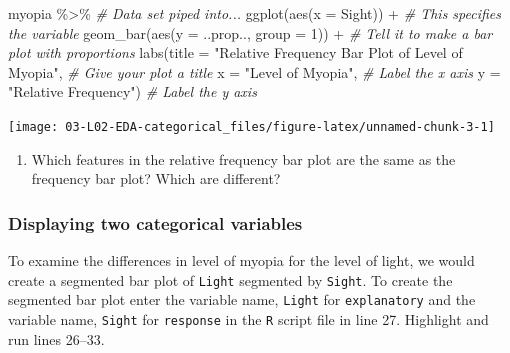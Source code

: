 \documentclass[
]{report}
\newenvironment{Shaded}{\begin{snugshade}}{\end{snugshade}}
\newcommand{\AttributeTok}[1]{\textcolor[rgb]{0.77,0.63,0.00}{#1}}
\newcommand{\CommentTok}[1]{\textcolor[rgb]{0.56,0.35,0.01}{\textit{#1}}}
\newcommand{\DecValTok}[1]{\textcolor[rgb]{0.00,0.00,0.81}{#1}}
\newcommand{\FunctionTok}[1]{\textcolor[rgb]{0.00,0.00,0.00}{#1}}
\newcommand{\NormalTok}[1]{#1}
\newcommand{\SpecialCharTok}[1]{\textcolor[rgb]{0.00,0.00,0.00}{#1}}
\newcommand{\StringTok}[1]{\textcolor[rgb]{0.31,0.60,0.02}{#1}}
\providecommand{\tightlist}{%
  \setlength{\itemsep}{0pt}\setlength{\parskip}{0pt}}
\begin{document}
\begin{Shaded}
\begin{Highlighting}[]
\NormalTok{myopia }\SpecialCharTok{\%\textgreater{}\%} \CommentTok{\# Data set piped into...}
\FunctionTok{ggplot}\NormalTok{(}\FunctionTok{aes}\NormalTok{(}\AttributeTok{x =}\NormalTok{ Sight)) }\SpecialCharTok{+}   \CommentTok{\# This specifies the variable}
  \FunctionTok{geom\_bar}\NormalTok{(}\FunctionTok{aes}\NormalTok{(}\AttributeTok{y =}\NormalTok{ ..prop.., }\AttributeTok{group =} \DecValTok{1}\NormalTok{)) }\SpecialCharTok{+}  \CommentTok{\# Tell it to make a bar plot with proportions}
  \FunctionTok{labs}\NormalTok{(}\AttributeTok{title =} \StringTok{"Relative Frequency Bar Plot of Level of Myopia"}\NormalTok{,  }\CommentTok{\# Give your plot a title}
       \AttributeTok{x =} \StringTok{"Level of Myopia"}\NormalTok{,   }\CommentTok{\# Label the x axis}
       \AttributeTok{y =} \StringTok{"Relative Frequency"}\NormalTok{)  }\CommentTok{\# Label the y axis}
\end{Highlighting}
\end{Shaded}

\begin{center}\texttt{[image: 03-L02-EDA-categorical\_files/figure-latex/unnamed-chunk-3-1]} \end{center}

\begin{enumerate}
\def\labelenumi{\arabic{enumi}.}
\setcounter{enumi}{3}
\tightlist
\item
  Which features in the relative frequency bar plot are the same as the frequency bar plot? Which are different?
\end{enumerate}

\newpage

\hypertarget{displaying-two-categorical-variables}{%
\subsubsection*{Displaying two categorical variables}\label{displaying-two-categorical-variables}}

To examine the differences in level of myopia for the level of light, we would create a segmented bar plot of \texttt{Light} segmented by \texttt{Sight}. To create the segmented bar plot enter the variable name, \texttt{Light} for \texttt{explanatory} and the variable name, \texttt{Sight} for \texttt{response} in the \texttt{R} script file in line 27. Highlight and run lines 26--33.
\end{document}
